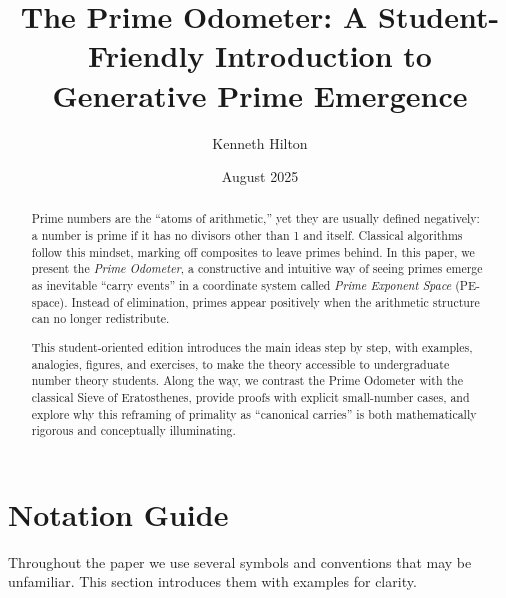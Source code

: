 \documentclass[11pt]{article}
\title{The Prime Odometer: A Student-Friendly Introduction to Generative Prime Emergence}
\author{Kenneth Hilton}
\date{August 2025}
\theoremstyle{definition}
\begin{document}
\maketitle

\begin{abstract}
Prime numbers are the ``atoms of arithmetic,'' yet they are usually defined negatively: 
a number is prime if it has no divisors other than 1 and itself. 
Classical algorithms follow this mindset, marking off composites to leave primes behind. 
In this paper, we present the \emph{Prime Odometer}, a constructive and intuitive way 
of seeing primes emerge as inevitable ``carry events'' in a coordinate system called 
\emph{Prime Exponent Space} (PE-space). Instead of elimination, primes appear positively 
when the arithmetic structure can no longer redistribute. 

This student-oriented edition introduces the main ideas step by step, with examples, 
analogies, figures, and exercises, to make the theory accessible to undergraduate number 
theory students. Along the way, we contrast the Prime Odometer with the classical Sieve 
of Eratosthenes, provide proofs with explicit small-number cases, and explore why this 
reframing of primality as ``canonical carries'' is both mathematically rigorous and 
conceptually illuminating.
\end{abstract}

\section*{Notation Guide}
Throughout the paper we use several symbols and conventions that may be unfamiliar. 
This section introduces them with examples for clarity.
\end{document}
